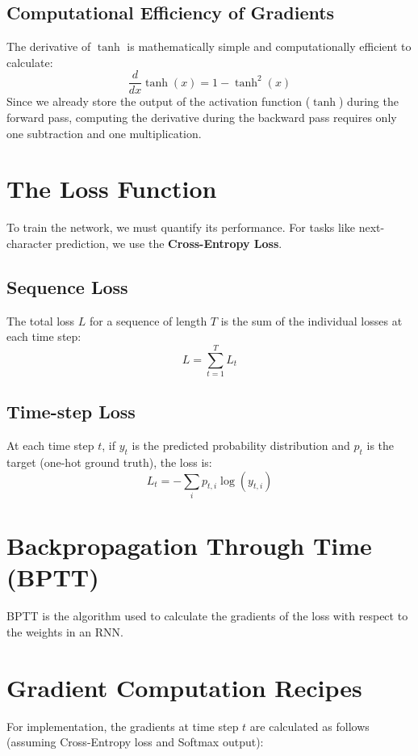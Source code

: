 \documentclass{article}
\begin{document}
\subsection{Computational Efficiency of Gradients}
The derivative of $\tanh$ is mathematically simple and computationally efficient to calculate:
\begin{equation}
\frac{d}{dx} \tanh(x) = 1 - \tanh^2(x)
\end{equation}
Since we already store the output of the activation function ($\tanh$) during the forward pass, computing the derivative during the backward pass requires only one subtraction and one multiplication.

\section{The Loss Function}
To train the network, we must quantify its performance. For tasks like next-character prediction, we use the \textbf{Cross-Entropy Loss}.

\subsection{Sequence Loss}
The total loss $L$ for a sequence of length $T$ is the sum of the individual losses at each time step:
\begin{equation}
L = \sum_{t=1}^{T} L_t
\end{equation}

\subsection{Time-step Loss}
At each time step $t$, if $y_t$ is the predicted probability distribution and $p_t$ is the target (one-hot ground truth), the loss is:
\begin{equation}
L_t = -\sum_{i} p_{t,i} \log(y_{t,i})
\end{equation}

\section{Backpropagation Through Time (BPTT)}
BPTT is the algorithm used to calculate the gradients of the loss with respect to the weights in an RNN.

\section{Gradient Computation Recipes}
For implementation, the gradients at time step $t$ are calculated as follows (assuming Cross-Entropy loss and Softmax output):
\end{document}
